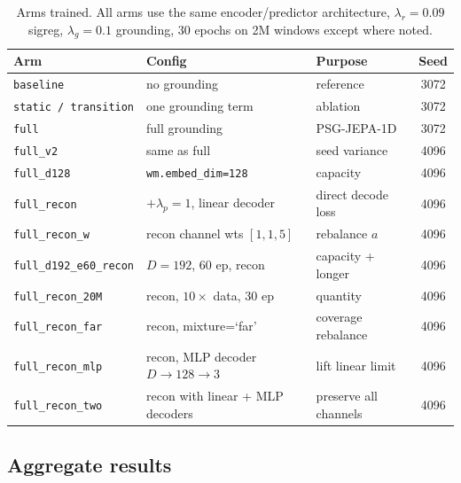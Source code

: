 \documentclass[11pt,a4paper]{article}
\begin{document}
\begin{table}[h]
\centering
\small
\caption{Arms trained. All arms use the same encoder/predictor architecture,
$\lambda_r{=}0.09$ sigreg, $\lambda_g{=}0.1$ grounding, 30 epochs on 2M windows
except where noted.}
\label{tab:arms}
\begin{tabular}{lllc}
\toprule
Arm & Config & Purpose & Seed \\
\midrule
\texttt{baseline}                & no grounding                              & reference          & 3072 \\
\texttt{static / transition}     & one grounding term                        & ablation           & 3072 \\
\texttt{full}                    & full grounding                            & PSG-JEPA-1D        & 3072 \\
\texttt{full\_v2}                & same as full                              & seed variance      & 4096 \\
\texttt{full\_d128}              & \texttt{wm.embed\_dim=128}                & capacity            & 4096 \\
\texttt{full\_recon}             & $+\lambda_p{=}1$, linear decoder          & direct decode loss  & 4096 \\
\texttt{full\_recon\_w}          & recon channel wts $[1,1,5]$               & rebalance $a$       & 4096 \\
\texttt{full\_d192\_e60\_recon}  & $D{=}192$, 60 ep, recon                   & capacity + longer   & 4096 \\
\texttt{full\_recon\_20M}        & recon, $10\times$ data, 30 ep             & quantity            & 4096 \\
\texttt{full\_recon\_far}        & recon, mixture=`far'                      & coverage rebalance  & 4096 \\
\texttt{full\_recon\_mlp}        & recon, MLP decoder $D{\to}128{\to}3$      & lift linear limit   & 4096 \\
\texttt{full\_recon\_two}        & recon with linear + MLP decoders          & preserve all channels & 4096 \\
\bottomrule
\end{tabular}
\end{table}

\subsection{Aggregate results}
\end{document}
